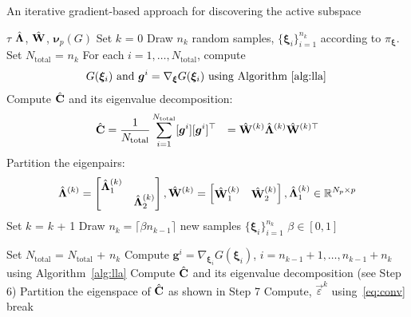 \begin{breakablealgorithm}
\renewcommand{\algorithmicrequire}{\textbf{Input:}}
\renewcommand{\algorithmicensure}{\textbf{Output:}}
  \caption{An iterative gradient-based approach for discovering the active subspace}
  \begin{algorithmic}[1]
\Require $\tau$
\Ensure $\hat{\mathbf{{\Lambda}}}$, $\hat{\mathbf{{W}}}$, $\bm{\nu}_p(G)$ %
    \State Set $k$ = 0
	\State Draw $n_k$ random samples, $\{\bm{\xi}_i\}_{i=1}^{n_k}$ 
         according to $\pi_{\bm{\xi}}$. 
    \State Set $N_\text{total}$ = $n_k$ 
	\State For each $i=1, \ldots, N_\text{total}$, compute
		\[
		\begin{aligned}
	          &{\color{white}=} G(\bm{\xi}_i)~\text{and}~\bm{g}^i = \nabla_{\bm{\xi}}G(\bm{\xi}_i)~
		 \text{using~Algorithm~\ref{alg:lla}}
		\end{aligned}
		\]
	\State Compute $\hat{\mathbf{{C}}}$ and its eigenvalue decomposition:
		\[
		\begin{aligned} 
		  \hat{\mathbf{{C}}} &= \frac{1}{N_\text{total}}\sum\limits_{i=1}^{N_\text{total}}[\bm{g}^i][\bm{g}^i]^\top 
		  &= \hat{\mathbf{{W}}}^{(k)}\hat{\mathbf{{\Lambda}}}^{(k)} \hat{\mathbf{{W}}}^{(k)\top}
		\end{aligned}
		\]
	\State Partition the eigenpairs:
	\[
		\begin{aligned}
		 \hat{\mathbf{{\Lambda}}}^{(k)}=
        	\begin{bmatrix} \hat{\mathbf{{\Lambda}}}_1^{(k)} & \\ & \hat{\mathbf{{\Lambda}}}_2^{(k)} \end{bmatrix}, 
        	\hat{\mathbf{{W}}}^{(k)}=\begin{bmatrix} \hat{\mathbf{{W}}}_1^{(k)} & \hat{\mathbf{{W}}}_2^{(k)} \end{bmatrix}, 
        	\hat{\mathbf{{\Lambda}}}_1^{(k)}\in \mathbb{R}^{N_p\times p}
		\end{aligned}
	\]
	\Loop
		\State Set $k$ = $k$ + 1
		\State Draw $n_k =  \lceil\beta n_{k-1}\rceil$  new samples 
                $\{\bm{\xi}_i\}_{i=1}^{n_k}$  $\beta\in[0,1]$
                
		\State Set $N_\text{total}$ = $N_\text{total}$ + $n_k$ 
		\State Compute $\bm{g}^i = \nabla_{\bm{\xi}_i}G(\bm{\xi}_i)$, 
             	$i=n_{k-1}+1, \ldots, n_{k-1}+n_k$ using Algorithm~\ref{alg:lla} 
		\State Compute $\hat{\mathbf{{C}}}$ and its eigenvalue decomposition (see Step 6)
		\State Partition the eigenspace of $\hat{\mathbf{{C}}}$ as shown in Step 7 
		\State Compute, $\vec\varepsilon^k$ using~\eqref{eq:conv} 
			\State break
		\EndIf
       \EndLoop
    \EndProcedure
  \end{algorithmic}
  \label{alg:free}
\end{breakablealgorithm}
\bigskip
%

